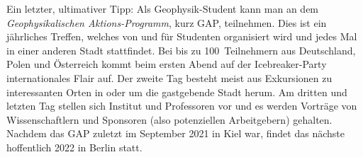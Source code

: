 \begin{multicols}{2}
Ein letzter, ultimativer Tipp: Als Geophysik-Student kann man an dem \emph{Geophysikalischen Aktions-Programm}, kurz GAP, teilnehmen.
Dies ist ein jährliches Treffen, welches von und für Studenten organisiert wird und jedes Mal in einer anderen Stadt stattfindet.
Bei bis zu 100~Teilnehmern aus Deutschland, Polen und Österreich kommt beim ersten Abend auf der Icebreaker-Party internationales Flair auf.
Der zweite Tag besteht meist aus Exkursionen zu interessanten Orten in oder um die gastgebende Stadt herum.
Am dritten und letzten Tag stellen sich Institut und Professoren vor und es werden Vorträge von Wissenschaftlern und Sponsoren (also potenziellen Arbeitgebern) gehalten.
Nachdem das GAP zuletzt im September 2021 in Kiel war, findet das nächste hoffentlich 2022 in Berlin statt.

\end{multicols}


